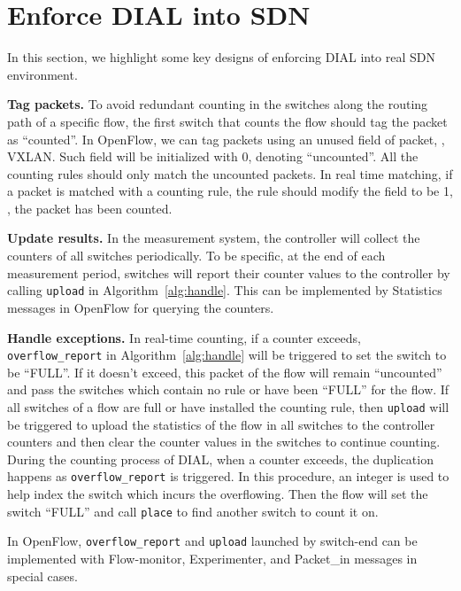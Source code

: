 \section{Enforce DIAL into SDN}\label{sec:imp}
In this section, we highlight some key designs of enforcing DIAL into real SDN environment.

\textbf{Tag packets.}
To avoid redundant counting in the switches along the routing path of a specific flow, the first switch that counts the flow should tag the packet as ``counted''.
In OpenFlow, we can tag packets using an unused field of packet, \eg, VXLAN.
Such field will be initialized with 0, denoting ``uncounted''.
All the counting rules should only match the uncounted packets.
In real time matching, if a packet is matched with a counting rule, the rule should modify the field to be 1, \ie, the packet has been counted.

\textbf{Update results.}
In the measurement system, the controller will collect the counters of all switches periodically.
To be specific, at the end of each measurement period, switches will report their counter values to the controller by calling \texttt{upload} in Algorithm~\ref{alg:handle}.
This can be implemented by Statistics messages in OpenFlow for querying the counters.

\textbf{Handle exceptions.}
In real-time counting, if a counter exceeds, \texttt{overflow\_report} in Algorithm~\ref{alg:handle} will be triggered to set the switch to be ``FULL''.
If it doesn't exceed, this packet of the flow will remain ``uncounted'' and pass the switches which contain no rule or have been ``FULL'' for the flow.
If all switches of a flow are full or have installed the counting rule, then \texttt{upload} will be triggered to upload the statistics of the flow in all switches to the controller counters and then clear the counter values in the switches to continue counting.
During the counting process of DIAL, when a counter exceeds, the duplication happens as \texttt{overflow\_report} is triggered.
In this procedure, an integer is used to help index the switch which incurs the overflowing.
Then the flow will set the switch ``FULL'' and call \texttt{place} to find another switch to count it on.

In OpenFlow, \texttt{overflow\_report} and \texttt{upload} launched by switch-end can be implemented with Flow-monitor, Experimenter, and Packet\_in messages in special cases.

